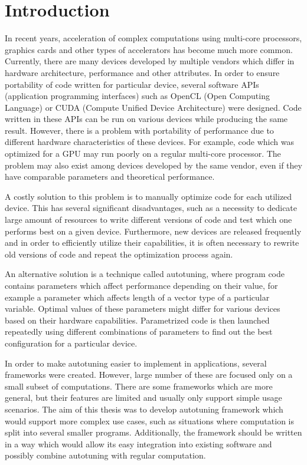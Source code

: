 \documentclass
[
    digital, %
    oneside, %
    table, %
    nolof, %
    nolot, %
    nocover %
]{fithesis3}
\begin{document}
\chapter{Introduction}
In recent years, acceleration of complex computations using multi-core processors, graphics cards and other types of accelerators has become
much more common. Currently, there are many devices developed by multiple vendors which differ in hardware architecture, performance and other
attributes. In order to ensure portability of code written for particular device, several software APIs (application programming interfaces) such as
OpenCL (Open Computing Language) or CUDA (Compute Unified Device Architecture) were designed. Code written in these APIs can be run on various
devices while producing the same result. However, there is a problem with portability of performance due to different hardware characteristics of
these devices. For example, code which was optimized for a GPU may run poorly on a regular multi-core processor. The problem may also exist among
devices developed by the same vendor, even if they have comparable parameters and theoretical performance.

A costly solution to this problem is to manually optimize code for each utilized device. This has several significant disadvantages, such as
a necessity to dedicate large amount of resources to write different versions of code and test which one performs best on a given device. Furthermore,
new devices are released frequently and in order to efficiently utilize their capabilities, it is often necessary to rewrite old versions of code and
repeat the optimization process again.

An alternative solution is a technique called autotuning, where program code contains parameters which affect performance depending on their value,
for example a parameter which affects length of a vector type of a particular variable. Optimal values of these parameters might differ for various
devices based on their hardware capabilities. Parametrized code is then launched repeatedly using different combinations of parameters to find out the
best configuration for a particular device.

In order to make autotuning easier to implement in applications, several frameworks were created. However, large number of these are focused
only on a small subset of computations. There are some frameworks which are more general, but their features are limited and usually only support
simple usage scenarios. The aim of this thesis was to develop autotuning framework which would support more complex use cases, such as situations
where computation is split into several smaller programs. Additionally, the framework should be written in a way which would allow its easy
integration into existing software and possibly combine autotuning with regular computation.
\end{document}
